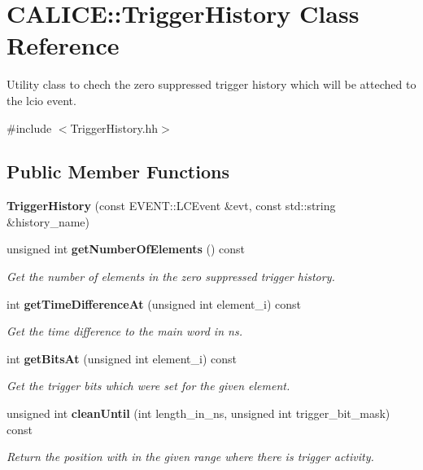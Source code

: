\section{C\-A\-L\-I\-C\-E\-:\-:Trigger\-History Class Reference}
\label{classCALICE_1_1TriggerHistory}


Utility class to chech the zero suppressed trigger history which will be atteched to the lcio event.  




{\ttfamily \#include $<$Trigger\-History.\-hh$>$}

\subsection*{Public Member Functions}
\begin{DoxyCompactItemize}
\item 
{\bfseries Trigger\-History} (const E\-V\-E\-N\-T\-::\-L\-C\-Event \&evt, const std\-::string \&history\-\_\-name)\label{classCALICE_1_1TriggerHistory_a0ace29a5ef70b51158c0a18cd45f5210}

\item 
unsigned int {\bf get\-Number\-Of\-Elements} () const \label{classCALICE_1_1TriggerHistory_a78e509a8ddba7a8dba943413a76683f5}

\begin{DoxyCompactList}\small\item\em Get the number of elements in the zero suppressed trigger history. \end{DoxyCompactList}\item 
int {\bf get\-Time\-Difference\-At} (unsigned int element\-\_\-i) const \label{classCALICE_1_1TriggerHistory_a7dbd50d2f2a00717b301f23612a19a70}

\begin{DoxyCompactList}\small\item\em Get the time difference to the main word in ns. \end{DoxyCompactList}\item 
int {\bf get\-Bits\-At} (unsigned int element\-\_\-i) const \label{classCALICE_1_1TriggerHistory_a8fa2b8146acbeac095128994c81fc81f}

\begin{DoxyCompactList}\small\item\em Get the trigger bits which were set for the given element. \end{DoxyCompactList}\item 
unsigned int {\bf clean\-Until} (int length\-\_\-in\-\_\-ns, unsigned int trigger\-\_\-bit\-\_\-mask) const 
\begin{DoxyCompactList}\small\item\em Return the position with in the given range where there is trigger activity. \end{DoxyCompactList}\end{DoxyCompactItemize}
